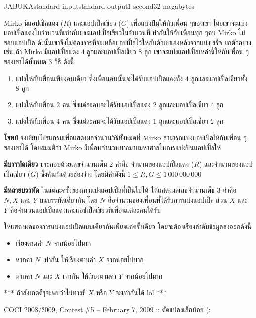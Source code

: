 \documentclass[11pt,a4paper]{article}
\begin{document}
\begin{problem}{JABUKA}{standard input}{standard output}{1 second}{32 megabytes}

Mirko มีแอปเปิ้ลแดง ($R$) และแอปเปิ้ลเขียว ($G$) เพื่อแบ่งปันให้กับเพื่อน ๆของเขา โดยเขาจะแบ่งแอปเปิ้ลแดงในจำนวนที่เท่ากันและแอปเปิ้ลเขียวในจำนวนที่เท่ากันให้กับเพื่อนทุก ๆคน Mirko ไม่ชอบแอปเปิ้ล ดังนั้นเขาจึงไม่ต้องการที่จะเหลือแอปเปิ้ลไว้ให้กับตัวเขาเองหลังจากแบ่งเสร็จ
ยกตัวอย่างเช่น ถ้า Mirko มีแอปเปิ้ลแดง $4$ ลูกและแอปเปิ้ลเขียว $8$ ลูก เขาจะแบ่งแอปเปิ้ลเหล่านี้ให้กับเพื่อน ๆของเขาได้ทั้งหมด $3$ วิธี ดังนี้
\begin{enumerate}

\item แบ่งให้กับเพื่อนเพียงคนเดียว ซึ่งเพื่อนคนนั้นจะได้รับแอปเปิ้ลแดงทั้ง $4$ ลูกและแอปเปิ้ลเขียวทั้ง $8$ ลูก
\item แบ่งให้กับเพื่อน $2$ คน ซึ่งแต่ละคนจะได้รับแอปเปิ้ลแดง $2$ ลูกและแอปเปิ้ลเขียว $4$ ลูก
\item แบ่งให้กับเพื่อน $4$ คน ซึ่งแต่ละคนจะได้รับแอปเปิ้ลแดง $1$ ลูกและแอปเปิ้ลเขียว $2$ ลูก
 \end{enumerate}   

\bigskip
\underline{\textbf{โจทย์}}  จงเขียนโปรแกรมเพื่อแสดงผลจำนวนวิธีทั้งหมดที่ Mirko สามารถแบ่งแอปเปิ้ลให้กับเพื่อน ๆของเขาได้ โดยสมมติว่า Mirko มีเพื่อนจำนวนมากมายมหาศาลในการแบ่งปันแอปเปิ้ลให้


\InputFile

\textbf{มีบรรทัดเดียว} ประกอบด้วยเลขจำนวนเต็ม $2$ ค่าคือ จำนวนของแอปเปิ้ลแดง ($R$) และจำนวนของแอปเปิ้ลเขียว ($G$) ซึ่งคั่นกันด้วยช่องว่าง โดยมีค่าดังนี้ $1 \leq R, G \leq 1\,000\,000\,000$


\OutputFile


\textbf{มีหลายบรรทัด} ในแต่ละครั้งของการแบ่งแอปเปิ้ลที่เป็นไปได้ ให้แสดงผลเลขจำนวนเต็ม $3$ ค่าคือ $N, X$ และ $Y$ บนบรรทัดเดียวกัน โดย $N$ คือจำนวนของเพื่อนที่ได้รับการแบ่งแอปเปิ้ล ส่วน $X$ และ $Y$ คือจำนวนแอปเปิ้ลแดงและแอปเปิ้ลเขียวที่เพื่อนแต่ละคนได้รับ

ให้แสดงผลของการแบ่งแอปเปิ้ลแบบเดียวกันเพียงแค่ครั้งเดียว โดยจะต้องเรียงลำดับข้อมูลส่งออกดังนี้
\begin{itemize}

\item เรียงตามค่า $N$ จากน้อยไปมาก
\item หากค่า $N$ เท่ากัน ให้เรียงตามค่า $X$ จากน้อยไปมาก
\item หากค่า $N$ และ $X$ เท่ากัน ให้เรียงตามค่า $Y$ จากน้อยไปมาก

\end{itemize}
\Examples

\begin{example}
%
%
%
\end{example}

\Note 

*** ถ้าสังเกตดีๆจะพบว่าไม่ทางที่ $X$ หรือ $Y$ จะเท่ากันได้ lol ***

\Source

COCI 2008/2009, Contest \#5 – February 7, 2009 :: ดัดแปลงเล็กน้อย (:

\end{problem}
\end{document}
